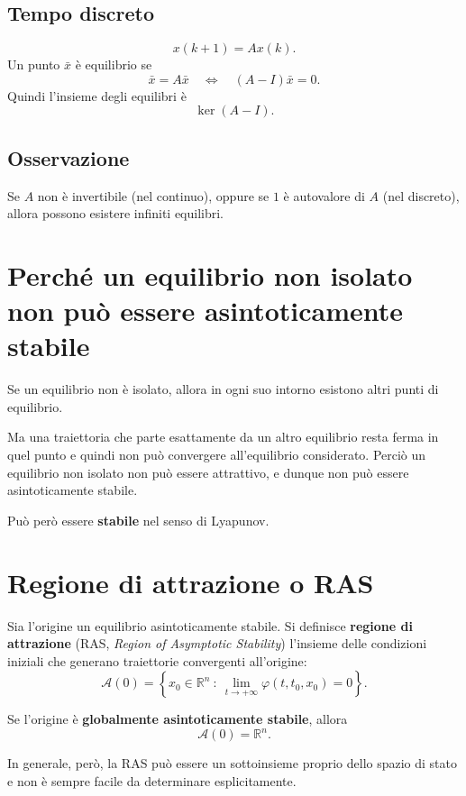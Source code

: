 \subsection{Tempo discreto}
\[
x(k+1)=Ax(k).
\]
Un punto \(\bar x\) è equilibrio se
\[
\bar x=A\bar x
\quad \Longleftrightarrow \quad
(A-I)\bar x=0.
\]
Quindi l'insieme degli equilibri è
\[
\ker(A-I).
\]

\subsection*{Osservazione}
Se \(A\) non è invertibile (nel continuo), oppure se \(1\) è autovalore di \(A\) (nel discreto), allora possono esistere infiniti equilibri.

\bigskip

\section{Perché un equilibrio non isolato non può essere asintoticamente stabile}

Se un equilibrio non è isolato, allora in ogni suo intorno esistono altri punti di equilibrio.

Ma una traiettoria che parte esattamente da un altro equilibrio resta ferma in quel punto e quindi non può convergere all'equilibrio considerato. Perciò un equilibrio non isolato non può essere attrattivo, e dunque non può essere asintoticamente stabile.

\medskip

\noindent
Può però essere \textbf{stabile} nel senso di Lyapunov.

\bigskip

\section{Regione di attrazione o RAS}

Sia l'origine un equilibrio asintoticamente stabile. Si definisce \textbf{regione di attrazione} (RAS, \emph{Region of Asymptotic Stability}) l'insieme delle condizioni iniziali che generano traiettorie convergenti all'origine:
\[
\mathcal{A}(0)=\left\{x_0 \in \mathbb{R}^n \ :\ \lim_{t\to +\infty}\varphi(t,t_0,x_0)=0 \right\}.
\]

Se l'origine è \textbf{globalmente asintoticamente stabile}, allora
\[
\mathcal{A}(0)=\mathbb{R}^n.
\]

In generale, però, la RAS può essere un sottoinsieme proprio dello spazio di stato e non è sempre facile da determinare esplicitamente.

